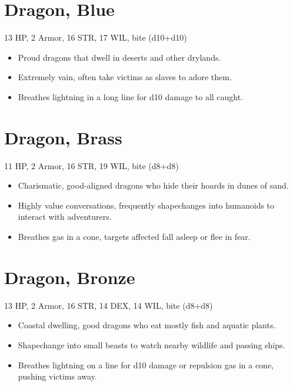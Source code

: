 \documentclass[
  10pt,
  american,
]{article}
\begin{document}
\hypertarget{dragon-blue}{%
\section{Dragon, Blue}\label{dragon-blue}}

13 HP, 2 Armor, 16 STR, 17 WIL, bite (d10+d10)

\begin{samepage}
\begin{itemize}
\setlength\itemsep{-.5em}
\item Proud dragons that dwell in deserts and other drylands.
\item Extremely vain, often take victims as slaves to adore them.
\item Breathes lightning in a long line for d10 damage to all caught.
\end{itemize}
\end{samepage}

\hypertarget{dragon-brass}{%
\section{Dragon, Brass}\label{dragon-brass}}

11 HP, 2 Armor, 16 STR, 19 WIL, bite (d8+d8)

\begin{samepage}
\begin{itemize}
\setlength\itemsep{-.5em}
\item Charismatic, good-aligned dragons who hide their hoards in dunes of sand.
\item Highly value conversations, frequently shapechanges into humanoids to interact with adventurers.
\item Breathes gas in a cone, targets affected fall asleep or flee in fear.
\end{itemize}
\end{samepage}

\hypertarget{dragon-bronze}{%
\section{Dragon, Bronze}\label{dragon-bronze}}

13 HP, 2 Armor, 16 STR, 14 DEX, 14 WIL, bite (d8+d8)

\begin{samepage}
\begin{itemize}
\setlength\itemsep{-.5em}

\item Coastal dwelling, good dragons who eat mostly fish and aquatic plants.
\item Shapechange into small beasts to watch nearby wildlife and passing ships.
\item Breathes lightning on a line for d10 damage or repulsion gas in a cone, pushing victims away.
\end{itemize}
\end{samepage}
\end{document}
